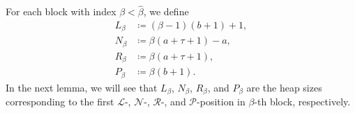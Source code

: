 \documentclass[oneside,reqno]{amsart}
\newcommand{\lp}{\mathscr{L}}
\newcommand{\rp}{\mathscr{R}}
\newcommand{\np}{\mathscr{N}}
\newcommand{\pp}{\mathscr{P}}
\newcommand{\hbeta}{\widehat\beta}
\begin{document}


For each block with index $\beta<\hbeta$, we define \begin{align}
    L_\beta&\coloneq(\beta-1)(b+1)+1,\label{eq:L-beta}\\
    N_\beta&\coloneq\beta(a+\tau+1)-a,\label{eq:N-beta}\\
    R_\beta&\coloneq\beta(a+\tau+1),\label{eq:R-beta}\\
    P_\beta&\coloneq\beta(b+1).\label{eq:P-beta}
\end{align} In the next lemma, we will see that $L_\beta$, $N_\beta$, $R_\beta$, and $P_\beta$ are the heap sizes corresponding to the first $\lp$-, $\np$-, $\rp$-, and $\pp$-position in $\beta$-th block, respectively. 


\end{document}
